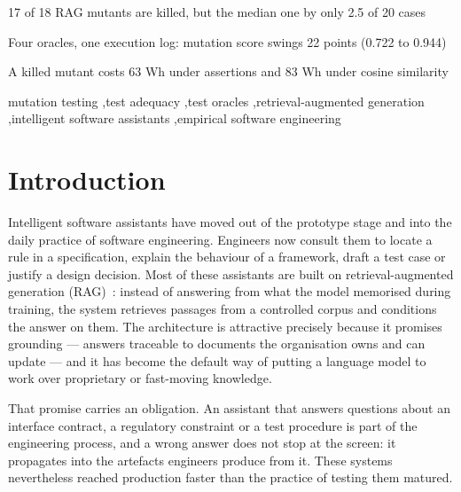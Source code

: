 \documentclass[a4paper,fleqn]{cas-dc}
\begin{document}
\begin{highlights}
\item 17 of 18 RAG mutants are killed, but the median one by only 2.5 of 20 cases
\item Four oracles, one execution log: mutation score swings 22 points (0.722 to 0.944)
\item A killed mutant costs 63 Wh under assertions and 83 Wh under cosine similarity
\end{highlights}

\begin{keywords}
mutation testing \sep test adequacy \sep test oracles \sep retrieval-augmented generation \sep intelligent software assistants \sep empirical software engineering
\end{keywords}

\maketitle

\section{Introduction}
\label{sec:intro}

Intelligent software assistants have moved out of the prototype stage and into
the daily practice of software engineering. Engineers now consult them to locate
a rule in a specification, explain the behaviour of a framework, draft a test
case or justify a design decision. Most of these assistants are built on
retrieval-augmented generation (RAG)~\cite{lewis2020rag}: instead of answering
from what the model memorised during training, the system retrieves passages
from a controlled corpus and conditions the answer on them. The architecture is
attractive precisely because it promises grounding --- answers traceable to
documents the organisation owns and can update --- and it has become the
default way of putting a language model to work over proprietary or fast-moving
knowledge.

That promise carries an obligation. An assistant that answers questions about
an interface contract, a regulatory constraint or a test procedure is part of
the engineering process, and a wrong answer does not stop at the screen: it
propagates into the artefacts engineers produce from it. These systems
nevertheless reached production faster than the practice of testing them
matured.
\end{document}
